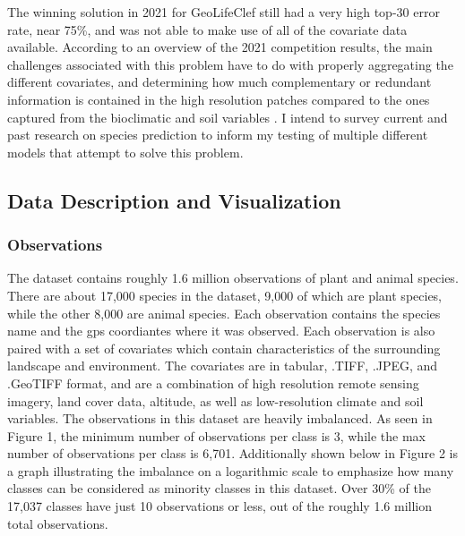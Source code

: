 \documentclass[12pt, oneside]{article}
\begin{document}
\begin{normalsize}
The winning solution in 2021 for GeoLifeClef still had a very high top-30 error rate, near 75\%, and was not able to make use of all of the covariate data available. According to an overview of the 2021 competition results, the main challenges associated with this problem have to do with properly aggregating the different covariates, and determining how much complementary or redundant information is contained in the high resolution patches compared to the ones captured from the bioclimatic and soil variables \cite{lorieul2021overview}. I intend to survey current and past research on species prediction to inform my testing of multiple different models that attempt to solve this problem. 

\subsection{Data Description and Visualization}

\subsubsection{Observations}

The dataset contains roughly 1.6 million observations of plant and animal species. There are about 17,000 species in the dataset, 9,000 of which are plant species, while the other 8,000 are animal species. Each observation contains the species name and the gps coordiantes where it was observed. Each observation is also paired with a set of covariates which contain characteristics of the surrounding landscape and environment. The covariates are in tabular, .TIFF, .JPEG, and .GeoTIFF format, and are a combination of high resolution remote sensing imagery, land cover data, altitude, as well as low-resolution climate and soil variables. The observations in this dataset are heavily imbalanced. As seen in Figure 1, the minimum number of observations per class is 3, while the max number of observations per class is 6,701. Additionally shown below in Figure 2 is a graph illustrating the imbalance on a logarithmic scale to emphasize how many classes can be considered as minority classes in this dataset. Over 30\% of the 17,037 classes have just 10 observations or less, out of the roughly 1.6 million total observations.


\end{normalsize}
\end{document}
